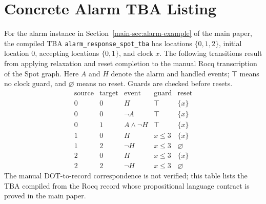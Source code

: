 \documentclass[10pt,journal,compsoc]{IEEEtran}
\begin{document}
\section{Concrete Alarm TBA Listing}
\label{app:alarm-tba}
For the alarm instance in Section~\ref{main-sec:alarm-example} of the main paper,
the compiled TBA \texttt{alarm\_response\_spot\_tba} has locations
$\{0,1,2\}$, initial location $0$, accepting locations $\{0,1\}$, and clock
$x$. The following transitions result from applying relaxation and reset
completion to the manual Rocq transcription of the Spot graph. Here $A$ and
$H$ denote the alarm and handled events; $\top$ means no clock guard, and
$\varnothing$ means no reset. Guards are checked before resets.
\[
\begin{array}{c|c|c|c|c}
\text{source}&\text{target}&\text{event}&\text{guard}&\text{reset}\\ \hline
0&0&H&\top&\{x\}\\
0&0&\neg A&\top&\{x\}\\
0&1&A\land\neg H&\top&\{x\}\\
1&0&H&x\le 3&\{x\}\\
1&2&\neg H&x\le 3&\varnothing\\
2&0&H&x\le 3&\{x\}\\
2&2&\neg H&x\le 3&\varnothing
\end{array}
\]
The manual DOT-to-record correspondence is not verified; this table lists the
TBA compiled from the Rocq record whose propositional language contract is
proved in the main paper.
\end{document}
